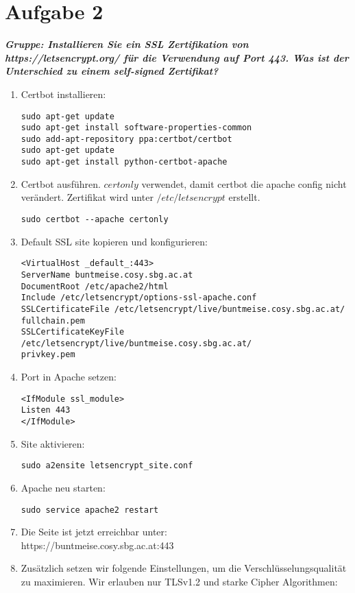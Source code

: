 \documentclass[12pt, a4paper]{report}
\begin{document}
\section*{Aufgabe 2}
\textbf{\textit{Gruppe: Installieren Sie ein SSL Zertifikation von https://letsencrypt.org/ für die
Verwendung auf Port 443. Was ist der Unterschied zu einem self-signed Zertifikat?}}\\
\begin{enumerate}
	\item Certbot installieren:
	\begin{verbatim}
sudo apt-get update
sudo apt-get install software-properties-common
sudo add-apt-repository ppa:certbot/certbot
sudo apt-get update
sudo apt-get install python-certbot-apache 
	\end{verbatim}
	\item Certbot ausführen. $certonly$ verwendet, damit certbot die apache config nicht verändert. Zertifikat wird unter $/etc/letsencrypt$ erstellt.
	\begin{verbatim}
sudo certbot --apache certonly
	\end{verbatim}
	\item Default SSL site kopieren und konfigurieren:
	\begin{verbatim}
<VirtualHost _default_:443>	
ServerName buntmeise.cosy.sbg.ac.at
DocumentRoot /etc/apache2/html
Include /etc/letsencrypt/options-ssl-apache.conf
SSLCertificateFile /etc/letsencrypt/live/buntmeise.cosy.sbg.ac.at/
fullchain.pem
SSLCertificateKeyFile /etc/letsencrypt/live/buntmeise.cosy.sbg.ac.at/
privkey.pem
	\end{verbatim}
	\item Port in Apache setzen:
	\begin{verbatim}
<IfModule ssl_module>
Listen 443
</IfModule>
	\end{verbatim}
	\item Site aktivieren:
	\begin{verbatim}
sudo a2ensite letsencrypt_site.conf
	\end{verbatim}	
	\item Apache neu starten:
	\begin{verbatim}
sudo service apache2 restart
	\end{verbatim}
	\item Die Seite ist jetzt erreichbar unter:\\
	https://buntmeise.cosy.sbg.ac.at:443
	\item Zusätzlich setzen wir folgende Einstellungen, um die Verschlüsselungsqualität zu maximieren. Wir erlauben nur TLSv1.2 und starke Cipher Algorithmen:

\end{enumerate}
\end{document}
